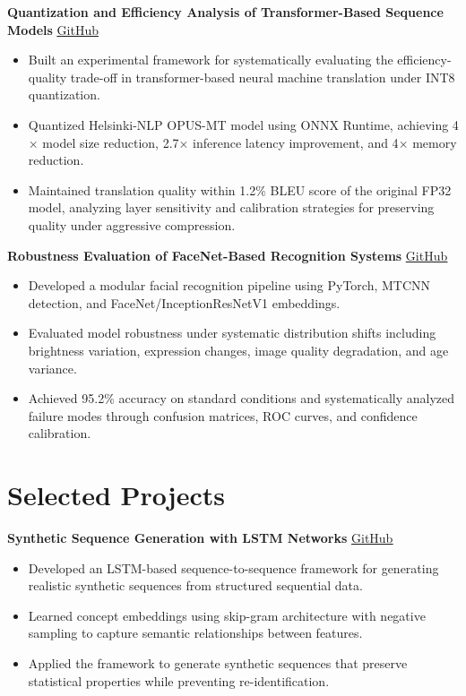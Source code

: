 \documentclass[10.5pt,a4paper]{article}
\begin{document}
\noindent\textbf{Quantization and Efficiency Analysis of Transformer-Based Sequence Models}
\hfill
\href{https://github.com/SaadARazzaq/onnx-translation-optimization}{\underline{GitHub}}
\begin{itemize}
    \item Built an experimental framework for systematically evaluating the efficiency-quality trade-off in transformer-based neural machine translation under INT8 quantization.
    \item Quantized Helsinki-NLP OPUS-MT model using ONNX Runtime, achieving 4$\times$ model size reduction, 2.7$\times$ inference latency improvement, and 4$\times$ memory reduction.
    \item Maintained translation quality within 1.2\% BLEU score of the original FP32 model, analyzing layer sensitivity and calibration strategies for preserving quality under aggressive compression.
\end{itemize}

\vspace{4pt}

\noindent\textbf{Robustness Evaluation of FaceNet-Based Recognition Systems}
\hfill
\href{https://github.com/SaadARazzaq/nn-face-recognition}{\underline{GitHub}}
\begin{itemize}
    \item Developed a modular facial recognition pipeline using PyTorch, MTCNN detection, and FaceNet/InceptionResNetV1 embeddings.
    \item Evaluated model robustness under systematic distribution shifts including brightness variation, expression changes, image quality degradation, and age variance.
    \item Achieved 95.2\% accuracy on standard conditions and systematically analyzed failure modes through confusion matrices, ROC curves, and confidence calibration.
\end{itemize}


\section*{Selected Projects}

\noindent\textbf{Synthetic Sequence Generation with LSTM Networks}
\hfill
\href{https://github.com/SaadARazzaq/medical-record-synthesis-rnn}{\underline{GitHub}}
\begin{itemize}
    \item Developed an LSTM-based sequence-to-sequence framework for generating realistic synthetic sequences from structured sequential data.
    \item Learned concept embeddings using skip-gram architecture with negative sampling to capture semantic relationships between features.
    \item Applied the framework to generate synthetic sequences that preserve statistical properties while preventing re-identification.
\end{itemize}
\end{document}
